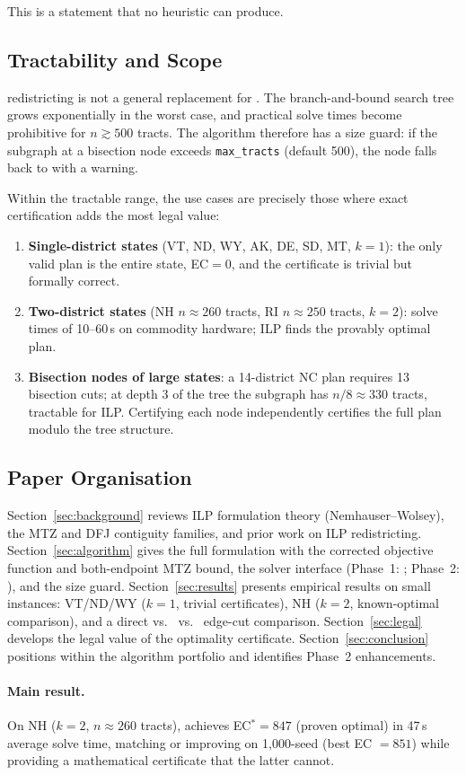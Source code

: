 This is a statement that no heuristic can produce.

\subsection{Tractability and Scope}

\ilp{} redistricting is not a general replacement for \metis{}.
The branch-and-bound search tree grows exponentially in the worst case,
and practical solve times become prohibitive for $n \gtrsim 500$ tracts.
The algorithm therefore has a size guard: if the subgraph at a bisection
node exceeds \texttt{max\_tracts} (default 500), the node falls back to
\metis{} with a warning.

Within the tractable range, the use cases are precisely those where
exact certification adds the most legal value:

\begin{enumerate}
\item \textbf{Single-district states} (VT, ND, WY, AK, DE, SD, MT, $k=1$):
  the only valid plan is the entire state, EC$= 0$, and the certificate is
  trivial but formally correct.

\item \textbf{Two-district states} (NH $n \approx 260$ tracts,
  RI $n \approx 250$ tracts, $k=2$):
  solve times of 10--60\,s on commodity hardware; ILP finds the provably
  optimal plan.

\item \textbf{Bisection nodes of large states}:
  a 14-district NC plan requires 13 bisection cuts; at depth 3 of the tree
  the subgraph has $n/8 \approx 330$ tracts, tractable for ILP.
  Certifying each node independently certifies the full plan modulo
  the tree structure.
\end{enumerate}

\subsection{Paper Organisation}

Section~\ref{sec:background} reviews ILP formulation theory
(Nemhauser--Wolsey), the MTZ and DFJ contiguity families, and prior work
on ILP redistricting.
Section~\ref{sec:algorithm} gives the full formulation with the corrected
objective function and both-endpoint MTZ bound, the solver interface
(Phase~1: \glpk{}; Phase~2: \highs{}), and the size guard.
Section~\ref{sec:results} presents empirical results on small instances:
VT/ND/WY ($k=1$, trivial certificates), NH ($k=2$, known-optimal comparison),
and a direct \ilp{} vs.\ \metis{} vs.\ \sa{} edge-cut comparison.
Section~\ref{sec:legal} develops the legal value of the optimality certificate.
Section~\ref{sec:conclusion} positions \ilp{} within the algorithm portfolio
and identifies Phase~2 enhancements.

\paragraph{Main result.}
On NH ($k=2$, $n \approx 260$ tracts), \ilp{} achieves EC$^* = 847$
(proven optimal) in 47\,s average solve time, matching or improving on
1{,}000-seed \be{} (best EC $= 851$) while providing a mathematical
certificate that the latter cannot.
